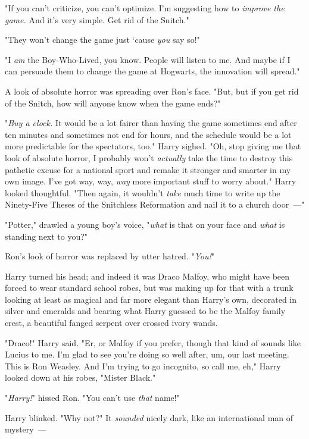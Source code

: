 "If you can't criticize, you can't optimize. I'm suggesting how to
\emph{improve the game.} And it's very simple. Get rid of the Snitch."

"They won't change the game just `cause \emph{you} say so!"

"I \emph{am} the Boy-Who-Lived, you know. People will listen to me. And maybe
if I can persuade them to change the game at Hogwarts, the innovation will
spread."

A look of absolute horror was spreading over Ron's face. "But, but if you get
rid of the Snitch, how will anyone know when the game ends?"

"\emph{Buy{\el} a{\el} clock.} It would be a lot fairer than having the
game sometimes end after ten minutes and sometimes not end for hours, and the
schedule would be a lot more predictable for the spectators, too." Harry
sighed. "Oh, stop giving me that look of absolute horror, I probably won't
\emph{actually} take the time to destroy this pathetic excuse for a national
sport and remake it stronger and smarter in my own image. I've got way, way,
\emph{way} more important stuff to worry about." Harry looked thoughtful. "Then
again, it wouldn't \emph{take} much time to write up the Ninety-Five Theses of
the Snitchless Reformation and nail it to a church door~---"

"Potter," drawled a young boy's voice, "\emph{what} is that on your face and
\emph{what} is standing next to you?"

Ron's look of horror was replaced by utter hatred. "\emph{You!}"

Harry turned his head; and indeed it was Draco Malfoy, who might have been
forced to wear standard school robes, but was making up for that with a trunk
looking at least as magical and far more elegant than Harry's own, decorated in
silver and emeralds and bearing what Harry guessed to be the Malfoy family
crest, a beautiful fanged serpent over crossed ivory wands.

"Draco!" Harry said. "Er, or Malfoy if you prefer, though that kind of sounds
like Lucius to me. I'm glad to see you're doing so well after, um, our last
meeting. This is Ron Weasley. And I'm trying to go incognito, so call me, eh,"
Harry looked down at his robes, "Mister Black."

"\emph{Harry!}" hissed Ron. "You can't use \emph{that} name!"

Harry blinked. "Why not?" It \emph{sounded} nicely dark, like an international
man of mystery~---

